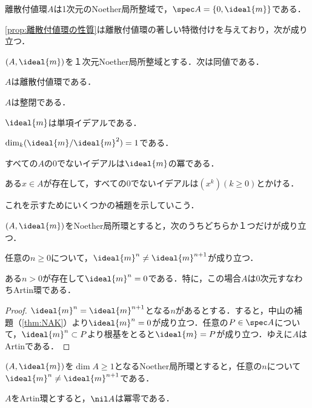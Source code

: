 \begin{cor}
	離散付値環$A$は1次元のNoether局所整域で，$\spec A=\{0,\ideal{m}\}$である．
\end{cor}

\ref{prop:離散付値環の性質}は離散付値環の著しい特徴付けを与えており，次が成り立つ．

\begin{thm}\label{thm:DVRの特徴づけ}
	$(A,\ideal{m})$を１次元Noether局所整域とする．次は同値である．
	\begin{sakura}
		\item $A$は離散付値環である．
		\item $A$は整閉である．
		\item $\ideal{m}$は単項イデアルである．
		\item $\dim_k (\ideal{m}/\ideal{m}^2)=1$である．
		\item すべての$A$の0でないイデアルは$\ideal{m}$の冪である．
		\item ある$x\in A$が存在して，すべての0でないイデアルは$(x^k) (k\geq0)$とかける．
	\end{sakura}
\end{thm}

これを示すためにいくつかの補題を示していこう．

\begin{prop}\label{prop:局所環がm^n=0ならArtin}
	$(A,\ideal{m})$をNoether局所環とすると，次のうちどちらか１つだけが成り立つ．
	\begin{sakura}
		\item 任意の$n\geq0$について，$\ideal{m}^n\neq\ideal{m}^{n+1}$が成り立つ．
		\item ある$n>0$が存在して$\ideal{m}^n=0$である．特に，この場合$A$は0次元すなわちArtin環である．
	\end{sakura}
\end{prop}

\begin{proof}
	$\ideal{m}^n=\ideal{m}^{n+1}$となる$n$があるとする．すると，中山の補題（\ref{thm:NAK}）より$\ideal{m}^n=0$が成り立つ．任意の$P\in\spec A$について，$\ideal{m}^n\subset P$より根基をとると$\ideal{m}=P$が成り立つ．ゆえに$A$はArtinである．
\end{proof}

\begin{cor}\label{lem:DVR-A}
	$(A,\ideal{m})$を$\dim A\geq1$となるNoether局所環とすると，任意の$n$について$\ideal{m}^n\neq\ideal{m}^{n+1}$である．
\end{cor}

\begin{lem}\label{lem:Artinならnil Aは冪零}
	$A$をArtin環とすると，$\nil A$は冪零である．
\end{lem}

